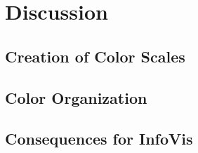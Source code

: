 \section{Discussion}
\label{sec:results_discussion}

\subsection{Creation of Color Scales}
\label{subsec:results_discussion_colorscales}

\subsection{Color Organization}
\label{subsec:results_discussion_colororganization}

\subsection{Consequences for InfoVis}
\label{subsec:results_discussion_infovis}

